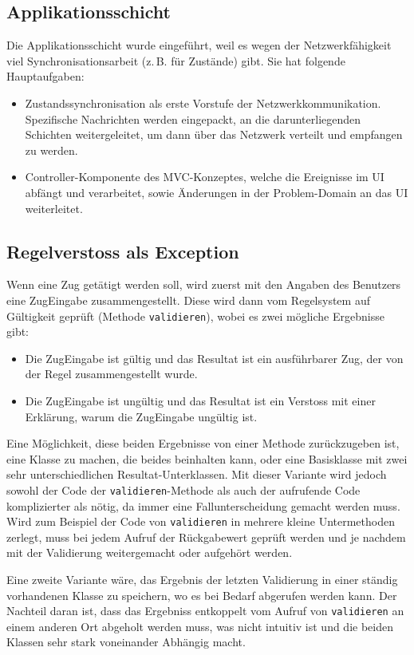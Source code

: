 \documentclass[12pt,halfparskip]{scrartcl}
\begin{document}
\subsection{Applikationsschicht}
Die Applikationsschicht wurde eingeführt, weil es wegen der Netzwerkfähigkeit viel Synchronisationsarbeit (z.\,B. für Zustände) gibt. Sie hat folgende Hauptaufgaben:
	\begin{itemize}
		\item Zustandssynchronisation als erste Vorstufe der Netzwerkkommunikation. Spezifische Nachrichten werden eingepackt, an die darunterliegenden Schichten weitergeleitet, um dann über das Netzwerk verteilt und empfangen zu werden.
		\item Controller-Komponente des MVC-Konzeptes, welche die Ereignisse im UI abfängt und verarbeitet, sowie Änderungen in der Problem-Domain an das UI weiterleitet.
	\end{itemize}

\subsection{Regelverstoss als Exception}

Wenn eine Zug getätigt werden soll, wird zuerst mit den Angaben des Benutzers eine ZugEingabe zusammengestellt. Diese wird dann vom Regelsystem auf Gültigkeit geprüft (Methode \texttt{validieren}), wobei es zwei mögliche Ergebnisse gibt:
\begin{itemize}
	\item Die ZugEingabe ist gültig und das Resultat ist ein ausführbarer Zug, der von der Regel zusammengestellt wurde.
	\item Die ZugEingabe ist ungültig und das Resultat ist ein Verstoss mit einer Erklärung, warum die ZugEingabe ungültig ist.
\end{itemize}

Eine Möglichkeit, diese beiden Ergebnisse von einer Methode zurückzugeben ist, eine Klasse zu machen, die beides beinhalten kann, oder eine Basisklasse mit zwei sehr unterschiedlichen Resultat-Unterklassen. Mit dieser Variante wird jedoch sowohl der Code der \texttt{validieren}-Methode als auch der aufrufende Code komplizierter als nötig, da immer eine Fallunterscheidung gemacht werden muss. Wird zum Beispiel der Code von \texttt{validieren} in mehrere kleine Untermethoden zerlegt, muss bei jedem Aufruf der Rückgabewert geprüft werden und je nachdem mit der Validierung weitergemacht oder aufgehört werden.

Eine zweite Variante wäre, das Ergebnis der letzten Validierung in einer ständig vorhandenen Klasse zu speichern, wo es bei Bedarf abgerufen werden kann. Der Nachteil daran ist, dass das Ergebniss entkoppelt vom Aufruf von \texttt{validieren} an einem anderen Ort abgeholt werden muss, was nicht intuitiv ist und die beiden Klassen sehr stark voneinander Abhängig macht.
\end{document}
